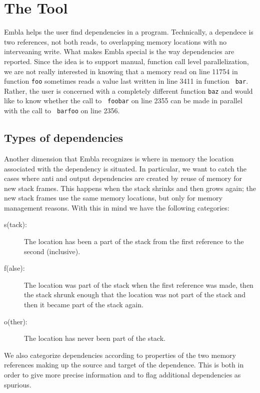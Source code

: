 %

\section{The Tool}

Embla helps the user find dependencies in a program. Technically, a
dependece is two references, not both reads, to overlapping memory
locations with no interveaning write. What makes Embla special is the
way dependencies are reported. Since the idea is to support manual,
function call level parallelization, we are not really interested in
knowing that a memory read on line 11754 in function {\tt foo}
sometimes reads a value last written in line 3411 in function {\tt
bar}. Rather, the user is concerned with a completely different
function {\tt baz} and would like to know whether the call to {\tt
foobar} on line 2355 can be made in parallel with the call to {\tt
barfoo} on line 2356.



\subsection{Types of dependencies}

Another dimension that Embla recognizes is where in memory the
location associated with the dependency is situated. In particular, we
want to catch the cases where anti and output dependencies are created
by reuse of memory for new stack frames. This happens when the stack 
shrinks and
then grows again; the new stack frames use the same memory locations,
but only for memory management reasons. With this in mind we have the
following categories:
\begin{description}
\item[s(tack):]
The location has been a part of the stack from the first reference to
the second (inclusive).
\item[f(alse):]
The location was part of the stack when the first reference was made,
then the stack shrunk enough that the location was not part of the
stack and then it became part of the stack again.
\item[o(ther):]
The location has never been part of the stack.
\end{description}

We also categorize dependencies according to properties of the two 
memory references making up the source and target of the dependence. 
This is both in order to give more precise information and to flag
additional dependencies as spurious. 

